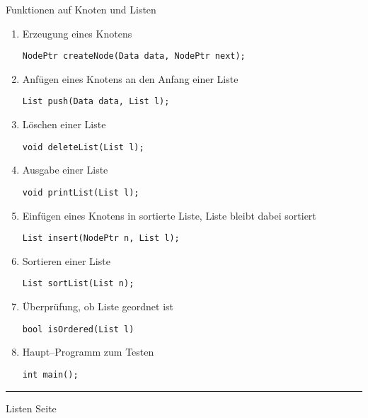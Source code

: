 \begin{slide}{}
\normalsize

\begin{center}
Funktionen auf Knoten und Listen
\end{center}
\vspace*{0.5cm}

\footnotesize
\begin{enumerate}
\item Erzeugung eines Knotens

      \texttt{NodePtr createNode(Data data, NodePtr next);}
\item Anf\"ugen eines Knotens an den Anfang einer Liste

      \texttt{List push(Data data, List l);}
\item L\"oschen einer Liste

      \texttt{void deleteList(List l);}
\item Ausgabe einer Liste

      \texttt{void printList(List l);}
\item Einf\"ugen eines Knotens in sortierte Liste, Liste bleibt dabei sortiert

      \texttt{List insert(NodePtr n, List l);}
\item Sortieren einer Liste

      \texttt{List sortList(List n);}
\item Überpr\"ufung, ob Liste geordnet ist

      \texttt{bool  isOrdered(List l)}
\item Haupt--Programm zum Testen

      \texttt{int main();}
\end{enumerate}


\vspace*{\fill}
\tiny \addtocounter{mypage}{1}
\rule{17cm}{1mm}
Listen  \hspace*{\fill} Seite 
\end{slide}



